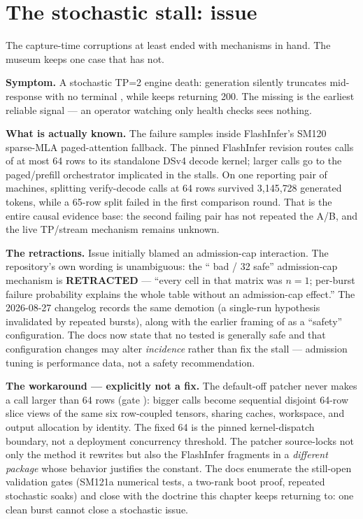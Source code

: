 \section{The stochastic stall: issue }
\label{sec:bugs-stall}

The capture-time corruptions at least ended with mechanisms in hand. The
museum keeps one case that has not.

\textbf{Symptom.} A stochastic TP=2 engine death: generation silently
truncates mid-response with no terminal , while
 keeps returning 200. The missing  is the
earliest reliable signal --- an operator watching only health checks sees
nothing.

\textbf{What is actually known.} The failure samples inside FlashInfer's SM120
sparse-MLA paged-attention fallback. The pinned FlashInfer revision routes
calls of at most 64 rows to its standalone DSv4 decode kernel; larger calls go
to the paged/prefill orchestrator implicated in the stalls. On one reporting
pair of machines, splitting verify-decode calls at 64 rows survived
3{,}145{,}728 generated tokens, while a 65-row split failed in the first
comparison round. That is the entire causal evidence base: the second failing
pair has not repeated the A/B, and the live TP/stream mechanism remains
unknown.

\textbf{The retractions.} Issue  initially blamed an
admission-cap interaction. The repository's own wording is unambiguous: the
 `` bad / 32 safe'' admission-cap mechanism
is \textbf{RETRACTED} --- ``every cell in that matrix was $n{=}1$; per-burst
failure probability explains the whole table without an admission-cap
effect.'' The 2026-08-27 changelog records the same demotion (a single-run
hypothesis invalidated by repeated  bursts), along with the
earlier framing of  as a ``safety''
configuration. The docs now state that no tested  is
generally safe and that configuration changes may alter \emph{incidence}
rather than fix the stall --- admission tuning is performance data, not a
safety recommendation.

\textbf{The workaround --- explicitly not a fix.} The default-off patcher
never makes a call larger than 64 rows (gate
): bigger calls become sequential disjoint 64-row slice views of
the same six row-coupled tensors, sharing caches, workspace, and output
allocation by identity. The fixed 64 is the pinned kernel-dispatch boundary,
not a deployment concurrency threshold. The patcher source-locks not only the
method it rewrites but also the FlashInfer fragments in a \emph{different
package} whose behavior justifies the constant. The docs enumerate the
still-open validation gates (SM121a numerical tests, a two-rank boot proof,
repeated stochastic soaks) and close with the doctrine this chapter keeps
returning to: one clean burst cannot close a stochastic issue.

